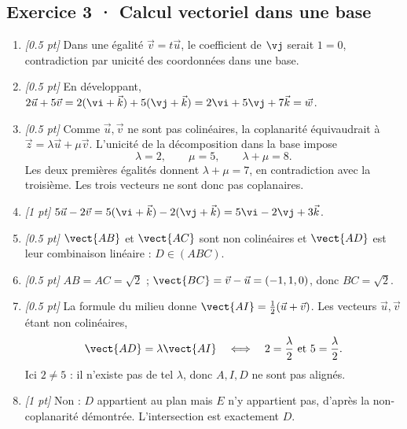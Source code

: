 \subsection*{Exercice 3 · Calcul vectoriel dans une base}\begin{enumerate}

\item \textit{[\num{0,5} pt]} Dans une égalité $\vec v=t\vec u$, le coefficient de $\vj $ serait $1=0$, contradiction par unicité des coordonnées dans une base.

\item \textit{[\num{0,5} pt]} En développant, $2\vec u+5\vec v=2(\vi +\vec k)+5(\vj +\vec k)=2\vi +5\vj +7\vec k=\vec w$.

\item \textit{[\num{0,5} pt]} Comme $\vec u,\vec v$ ne sont pas colinéaires, la coplanarité équivaudrait à $\vec z=\lambda\vec u+\mu\vec v$. L'unicité de la décomposition dans la base impose
\[\lambda=2,\qquad\mu=5,\qquad\lambda+\mu=8.\]
Les deux premières égalités donnent $\lambda+\mu=7$, en contradiction avec la troisième. Les trois vecteurs ne sont donc pas coplanaires.

\item \textit{[1 pt]} $5\vec u-2\vec v=5(\vi +\vec k)-2(\vj +\vec k)=5\vi -2\vj +3\vec k$.

\item \textit{[\num{0,5} pt]} $\vect{AB}$ et $\vect{AC}$ sont non colinéaires et $\vect{AD}$ est leur combinaison linéaire : $D\in(ABC)$.

\item \textit{[\num{0,5} pt]} $AB=AC=\sqrt2$ ; $\vect{BC}=\vec v-\vec u=(-1,1,0)$, donc $BC=\sqrt2$.

\item \textit{[\num{0,5} pt]} La formule du milieu donne $\vect{AI}=\frac12(\vec u+\vec v)$. Les vecteurs $\vec u,\vec v$ étant non colinéaires,
\[\vect{AD}=\lambda\vect{AI}\quad\Longleftrightarrow\quad 2=\frac{\lambda}{2}\ \text{et}\ 5=\frac{\lambda}{2}.\]
Ici $2\ne 5$ : il n'existe pas de tel $\lambda$, donc $A,I,D$ ne sont pas alignés.

\item \textit{[1 pt]} Non : $D$ appartient au plan mais $E$ n'y appartient pas, d'après la non-coplanarité démontrée. L'intersection est exactement $D$.

\end{enumerate}

